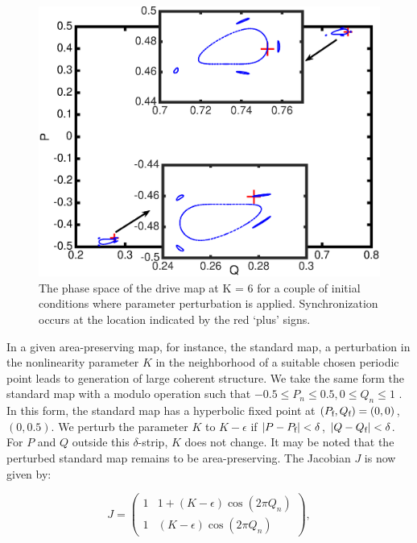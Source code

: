 \documentclass[reprint,amsmath,amssymb,aps,pre]{revtex4-1}
\begin{document}
\begin{figure}[t]
    \includegraphics[scale=0.45]{Fast_sync_location.eps}
    \caption{\label{fig:location}\footnotesize The phase space of the drive 
        map at K = 6 for a couple of initial conditions where parameter 
        perturbation is applied. Synchronization occurs at the location 
        indicated
        by the red `plus' signs.}
\end{figure}
In a given area-preserving map, for instance, the  standard map, a  
perturbation in the nonlinearity parameter $K$ in the neighborhood of a 
suitable chosen periodic point leads to generation of large coherent 
structure.   We take the same form the standard map with a modulo operation 
such that $-0.5 \leq P_n \leq 0.5, 0\leq Q_n \leq 1$ . In this form, the 
standard map has a hyperbolic fixed point at 
$(P_\textnormal{f},Q_\textnormal{f}) = (0,0)$,$(0,0.5)$. We perturb the 
parameter $K$ to $K-\epsilon$ if $|P - P_\textnormal{f}| 
< \delta$, $|Q-Q_\textnormal{f}| < \delta$. For $P$ and $Q$ outside this 
$\delta$-strip, 
$K$ does not change.  It may be noted that the perturbed standard map remains 
to be area-preserving. The Jacobian $J$ is now given by: 

\begin{minipage}[t]{0.45\textwidth}
	\centering
	\[ J = \left( \begin{array}{cc}
	1 & 1 + (K-\epsilon)\cos(2\pi Q_n)   \\
	1 & (K-\epsilon)\cos(2\pi Q_n) \end{array} \right),\]
\end{minipage}
\end{document}
